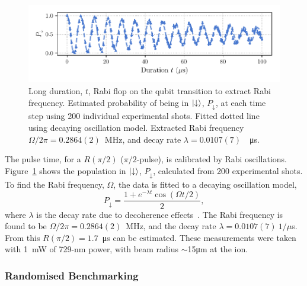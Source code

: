     \begin{figure}
        \begin{center}
        \noindent\includegraphics[width=\linewidth]{
            figures/pdf_figure/long_flop.pdf
            }
        \end{center}
        \caption{Long duration, $t$, Rabi flop on the qubit transition to extract Rabi frequency. Estimated probability of being in $\ket{\downarrow}$, $P_\downarrow$, at each time step using 200 individual experimental shots. Fitted dotted line using decaying oscillation model. Extracted Rabi frequency $\Omega/2\pi = 0.2864(2)$~\unit{\MHz}, and decay rate $\lambda = 0.0107(7)$~\unit{\per\us}. 
            }
        \label{fig:Long Flop}
    \end{figure}

    The pulse time, for a $R(\pi/2)$ ($\pi/2$-pulse), is calibrated by Rabi oscillations. Figure~\ref{fig:Long Flop} shows the population in $\ket{\downarrow}$, $P_\downarrow$, calculated from 200 experimental shots.
    To find the Rabi frequency, $\Omega$, the data is fitted to a decaying oscillation model,
    \begin{equation}
        P_{\downarrow} = \frac{1 + e^{-\lambda t} \cos(\Omega t/2)}{2},
    \end{equation}
    where $\lambda$ is the decay rate due to decoherence
    effects~\cite{wineland1998experimental}. The Rabi frequency is found to be
    $\Omega/2\pi = 0.2864(2)$~\unit{\MHz}, and the decay rate $\lambda =
    0.0107(7)~1/\mu$s.
    From this $R(\pi/2) = 1.7$~\unit{\us} can be estimated.
    These measurements were taken with 1~mW of 729-nm power,
    with beam radius $\sim$15\unit{\um} at the ion.\\
    

\subsubsection{Randomised Benchmarking}

